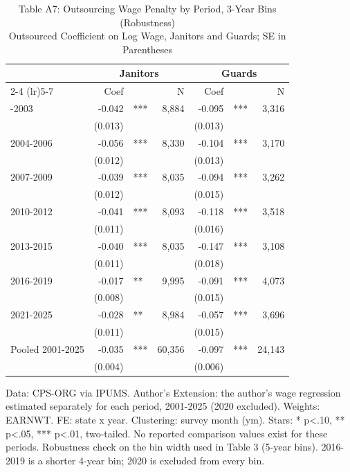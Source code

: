 \begin{table}[!t]
\caption*{
{\large Table A7: Outsourcing Wage Penalty by Period, 3-Year Bins (Robustness)} \\
{\small Outsourced Coefficient on Log Wage, Janitors and Guards; SE in Parentheses}
} 

\fontsize{10.0pt}{12.0pt}\selectfont

\begin{tabular*}{\linewidth}{@{\extracolsep{\fill}}l|rlrrlr}
\toprule
  & \multicolumn{3}{c}{Janitors} & \multicolumn{3}{c}{Guards} \\ 
\cmidrule(lr){2-4} \cmidrule(lr){5-7}
  & Coef &  & N & Coef &  & N \\ 
\midrule\addlinespace[2.5pt]
2001-2003 & -0.042 & *** & 8,884 & -0.095 & *** & 3,316 \\
 & (0.013) &  &  & (0.013) &  &  \\
2004-2006 & -0.056 & *** & 8,330 & -0.104 & *** & 3,170 \\
 & (0.012) &  &  & (0.013) &  &  \\
2007-2009 & -0.039 & *** & 8,035 & -0.094 & *** & 3,262 \\
 & (0.012) &  &  & (0.015) &  &  \\
2010-2012 & -0.041 & *** & 8,093 & -0.118 & *** & 3,518 \\
 & (0.011) &  &  & (0.016) &  &  \\
2013-2015 & -0.040 & *** & 8,035 & -0.147 & *** & 3,108 \\
 & (0.011) &  &  & (0.018) &  &  \\
2016-2019 & -0.017 & ** & 9,995 & -0.091 & *** & 4,073 \\
 & (0.008) &  &  & (0.015) &  &  \\
2021-2025 & -0.028 & ** & 8,984 & -0.057 & *** & 3,696 \\
 & (0.011) &  &  & (0.015) &  &  \\
Pooled 2001-2025 & -0.035 & *** & 60,356 & -0.097 & *** & 24,143 \\
 & (0.004) &  &  & (0.006) &  &  \\
\bottomrule
\end{tabular*}
\begin{minipage}{\linewidth}
Data: CPS-ORG via IPUMS. Author's Extension: the author's wage regression estimated separately for each period, 2001-2025 (2020 excluded). Weights: EARNWT. FE: state x year. Clustering: survey month (ym). Stars: * p<.10, ** p<.05, *** p<.01, two-tailed. No reported comparison values exist for these periods. Robustness check on the bin width used in Table 3 (5-year bins). 2016-2019 is a shorter 4-year bin; 2020 is excluded from every bin.\\
\end{minipage}
\end{table}
